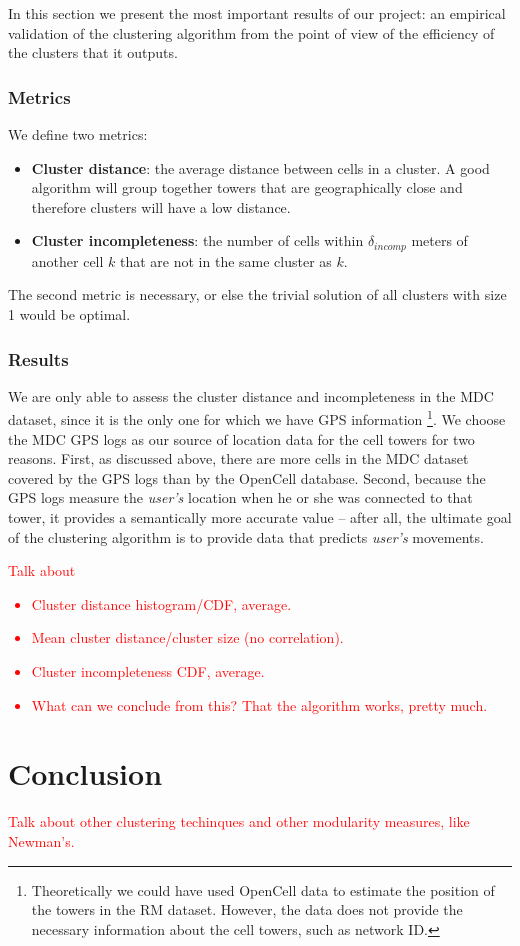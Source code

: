 \documentclass[a4paper,10pt]{article}
\newcommand{\xxx}[1]{\textcolor{red}{#1}}
\begin{document}
In this section we present the most important results of our project: an empirical validation of the clustering algorithm from the point of view of the efficiency of the clusters that it outputs.

\subsubsection{Metrics}

We define two metrics:

\begin{itemize}
	\item \textbf{Cluster distance}: the average distance between cells in a cluster. A good algorithm will group together towers that are geographically close and therefore clusters will have a low distance.
	\item \textbf{Cluster incompleteness}: the number of cells within $\delta_{incomp}$ meters of another cell $k$ that are not in the same cluster as $k$.
\end{itemize}

The second metric is necessary, or else the trivial solution of all clusters with size 1 would be optimal.

\subsubsection{Results}

We are only able to assess the cluster distance and incompleteness in the MDC dataset, since it is the only one for which we have GPS information \footnote{Theoretically we could have used OpenCell data to estimate the position of the towers in the RM dataset. However, the data does not provide the necessary information about the cell towers, such as network ID.}. We choose the MDC GPS logs as our source of location data for the cell towers for two reasons. First, as discussed above, there are more cells in the MDC dataset covered by the GPS logs than by the OpenCell database. Second, because the GPS logs measure the \textit{user's} location when he or she was connected to that tower, it provides a semantically more accurate value -- after all, the ultimate goal of the clustering algorithm is to provide data that predicts \textit{user's} movements.

\xxx{Talk about\begin{itemize}
	\item Cluster distance histogram/CDF, average.
	\item Mean cluster distance/cluster size (no correlation).
	\item Cluster incompleteness CDF, average.
	\item What can we conclude from this? That the algorithm works, pretty much.
\end{itemize}}



\section{Conclusion}

\xxx{Talk about other clustering techinques and other modularity measures, like Newman's.}



\end{document}
